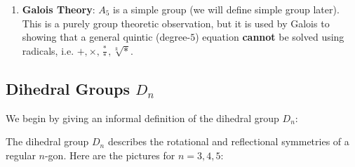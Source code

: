 \begin{example}
\begin{enumerate}
\begin{center}
\end{center}
    
    
    \item \textbf{Galois Theory}: $A_5$ is a simple group (we will define simple group later). This is a purely group theoretic observation, but it is used by Galois to showing that a general quintic (degree-$5$) equation {\bf cannot} be solved using radicals, i.e. $+, \times, \frac{*}{*}, \sqrt[k]{*}$.
\end{enumerate}
\end{example}
\subsection*{Dihedral Groups $D_n$}
We begin by giving an informal definition of the dihedral group $D_n$: 
\begin{center}
The dihedral group $D_n$ describes the rotational and reflectional symmetries of a regular $n$-gon. Here are the pictures for $n = 3, 4, 5$:
\end{center}

